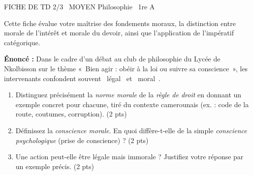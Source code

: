 \documentclass[11pt]{article}
\begin{document}
\begin{tcolorbox}[enhanced,colback=popink,colframe=popink,arc=10pt,boxrule=0pt,left=12pt,right=12pt,top=9pt,bottom=9pt]
{\color{white}\popxbold\small FICHE DE TD 2/3 \textbullet\ MOYEN \hfill Philosophie \textbullet\ 1re A\par}
\end{tcolorbox}
\vspace{4pt}
Cette fiche évalue votre maîtrise des fondements moraux, la distinction entre morale de l'intérêt et morale du devoir, ainsi que l'application de l'impératif catégorique.

\begin{exercice}
\textbf{Énoncé :} Dans le cadre d'un débat au club de philosophie du Lycée de Nkolbisson sur le thème «~Bien agir : obéir à la loi ou suivre sa conscience~», les intervenants confondent souvent \og~légal~{} et \og~moral~{}.
\begin{enumerate}
    \item Distinguez précisément la \textit{norme morale} de la \textit{règle de droit} en donnant un exemple concret pour chacune, tiré du contexte camerounais (ex. : code de la route, coutumes, corruption). \hfill (2 pts)
    \item Définissez la \textit{conscience morale}. En quoi diffère-t-elle de la simple \textit{conscience psychologique} (prise de conscience) ? \hfill (2 pts)
    \item Une action peut-elle être légale mais immorale ? Justifiez votre réponse par un exemple précis. \hfill (2 pts)
\end{enumerate}
\end{exercice}
\end{document}
